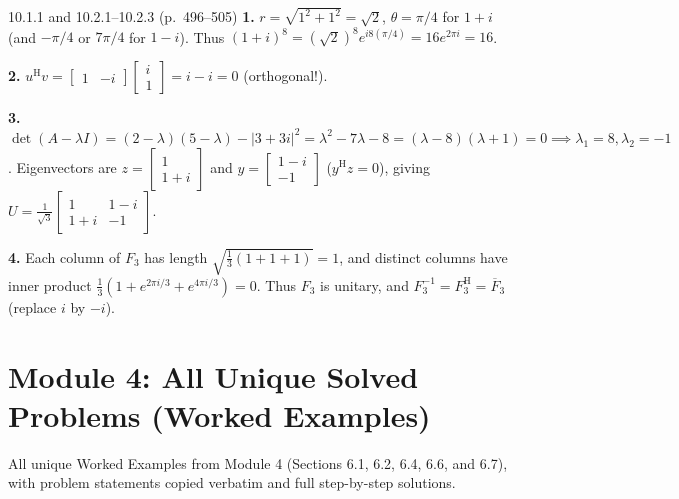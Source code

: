 \documentclass[11pt,a4paper,openany,oneside]{book}
\def\vect#1{#1}%
\def\mathbf#1{#1}%
\newcommand{\vect}[1]{\mathbf{#1}}
\newcommand{\Herm}{\mathrm{H}}
\numberwithin{equation}{chapter}
\begin{document}
\vfill
\begin{pageend_sol}{10.1.1 and 10.2.1--10.2.3 (p.\ 496--505)}
\textbf{1.} $r = \sqrt{1^2+1^2} = \sqrt{2}$, $\theta = \pi/4$ for $1+i$ (and $-\pi/4$ or $7\pi/4$ for $1-i$). Thus $(1+i)^8 = (\sqrt{2})^8 e^{i8(\pi/4)} = 16e^{2\pi i} = 16$.

\textbf{2.} $\vect{u}^\Herm\vect{v} = \begin{bmatrix}1 & -i\end{bmatrix}\begin{bmatrix}i\\1\end{bmatrix} = i - i = 0$ (orthogonal!).

\textbf{3.} $\det(A-\lambda I) = (2-\lambda)(5-\lambda) - |3+3i|^2 = \lambda^2 - 7\lambda - 8 = (\lambda-8)(\lambda+1) = 0 \implies \lambda_1=8, \lambda_2=-1$. Eigenvectors are $\vect{z} = \begin{bmatrix}1\\1+i\end{bmatrix}$ and $\vect{y} = \begin{bmatrix}1-i\\-1\end{bmatrix}$ ($\vect{y}^\Herm\vect{z} = 0$), giving $U = \frac{1}{\sqrt{3}}\begin{bmatrix}1 & 1-i\\1+i & -1\end{bmatrix}$.

\textbf{4.} Each column of $F_3$ has length $\sqrt{\frac{1}{3}(1+1+1)} = 1$, and distinct columns have inner product $\frac{1}{3}(1 + e^{2\pi i/3} + e^{4\pi i/3}) = 0$. Thus $F_3$ is unitary, and $F_3^{-1} = F_3^\Herm = \overline{F}_3$ (replace $i$ by $-i$).
\end{pageend_sol}
\clearpage
\chapter[Module 4: Unique Solved Problems]{Module 4: All Unique Solved Problems (Worked Examples)}

\begin{syll}
All unique Worked Examples from Module 4 (Sections 6.1, 6.2, 6.4, 6.6, and 6.7), with problem statements copied verbatim and full step-by-step solutions.
\end{syll}
\end{document}
